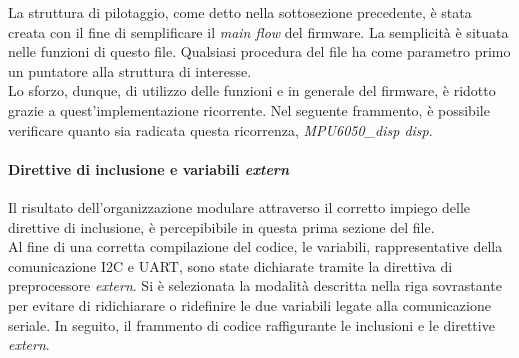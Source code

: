 \documentclass[11pt]{report}
\begin{document}
La struttura di pilotaggio, come detto nella sottosezione precedente, è stata creata con il fine di semplificare il \textit{main flow} del firmware. La semplicità è situata nelle funzioni di questo file. Qualsiasi procedura del file ha come parametro primo un puntatore alla struttura di interesse.\\
Lo sforzo, dunque, di utilizzo delle funzioni e in generale del firmware, è ridotto grazie a quest'implementazione ricorrente.
Nel seguente frammento, è possibile verificare quanto sia radicata questa ricorrenza, \textit{MPU6050\_disp disp}.


\paragraph{Direttive di inclusione e variabili \textit{extern}}
Il risultato dell'organizzazione modulare attraverso il corretto impiego delle direttive di inclusione, è percepibibile in questa prima sezione del file.\\
Al fine di una corretta compilazione del codice, le variabili, rappresentative della comunicazione I2C e UART, sono state dichiarate tramite la direttiva di preprocessore \textit{extern}.
Si è selezionata la modalità descritta nella riga sovrastante per evitare di ridichiarare o ridefinire le due variabili legate alla comunicazione seriale.
In seguito, il frammento di codice raffigurante le inclusioni e le direttive \textit{extern}.

\end{document}

